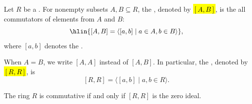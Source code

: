 \begin{definition} \label{definition:commutator_ideal_of_two_subsets_of_a_ring}
    Let $R$ be a . For nonempty subsets $A, B \subseteq R$, the , denoted by \hl{$[A,B]$}, is the  all commutators of elements from $A$ and $B$:
    $$\hlin{[A,B] = \langle [a,b] \mid a \in A, b \in B \rangle},$$
    where $[a,b]$ denotes the .

    When $A = B$, we write $[A,A]$ instead of $[A,B]$. In particular, the , denoted by \hl{$[R,R]$}, is
    $$[R,R] = \langle [a,b] \mid a,b \in R \rangle.$$

    The ring $R$ is commutative if and only if $[R,R]$ is the zero ideal.
\end{definition}
